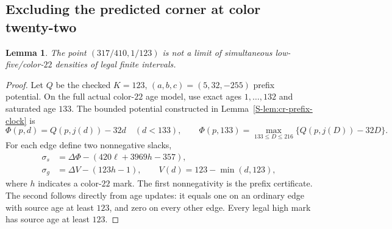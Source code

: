 \documentclass[11pt,reqno]{amsart}
\theoremstyle{plain}
\theoremstyle{plain}
\theoremstyle{plain}
\newtheorem{Slemma}[Stheorem]{Lemma}
\begin{document}
\subsection{Excluding the predicted corner at color twenty-two}
\label{S-supp:cr-onset}

\begin{Slemma}\label{S-lem:cr-exclude22}
The point $(317/410,1/123)$ is not a limit of simultaneous
low-five/color-$22$ densities of legal finite intervals.
\end{Slemma}
\begin{proof}
Let $Q$ be the checked $K=123$, $(a,b,c)=(5,32,-255)$ prefix
potential. On the full actual color-$22$ age model, use exact
ages $1,\ldots,132$ and saturated age $133$. The bounded
potential constructed in Lemma~\ref{S-lem:cr-prefix-clock} is
\[
 \Phi(p,d)=Q(p,j(d))-32d\quad(d<133),\qquad
 \Phi(p,133)=\max_{133\le D\le216}\{Q(p,j(D))-32D\}.
\]
For each edge define two nonnegative slacks,
\begin{align*}
 \sigma_s&=\Delta\Phi-(420\ell+3969h-357),\\
 \sigma_g&=\Delta V-(123h-1),\qquad
              V(d)=123-\min(d,123),
\end{align*}
where $h$ indicates a color-$22$ mark. The first nonnegativity
is the prefix certificate. The second follows directly from
age updates: it equals one on an ordinary edge with source
age at least $123$, and zero on every other edge. Every legal
high mark has source age at least $123$.


\end{proof}
\end{document}

